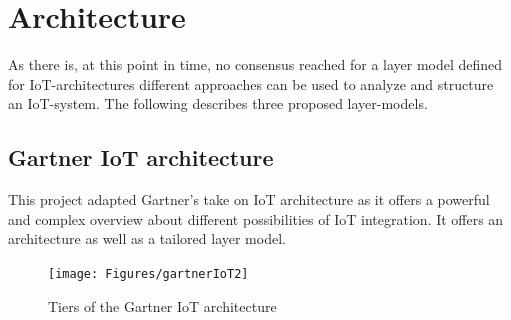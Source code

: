 \section{Architecture}

As there is, at this point in time, no consensus reached for a layer model defined for IoT-architectures \parencite{noModel}
different approaches can be used to analyze and structure an IoT-system. 
The following describes three proposed layer-models.

\subsection{Gartner IoT architecture}

This project adapted Gartner's take on IoT architecture as it offers a powerful and complex overview about different 
possibilities of IoT integration. 
It offers an architecture as well as a tailored layer model.

\begin{figure}[th]
	\centering
	\texttt{[image: Figures/gartnerIoT2]}
	\decoRule
	\caption[Gartner]{Tiers of the Gartner IoT architecture}
	\label{fig:gartnerIoT2}
\end{figure}

